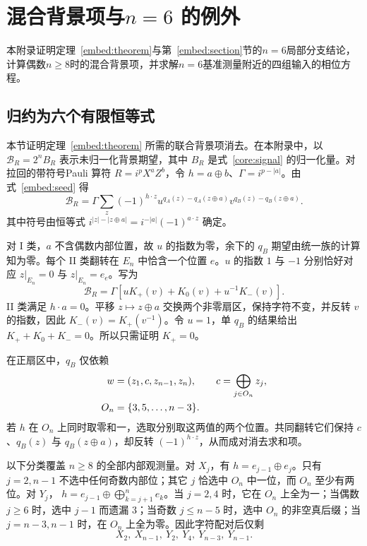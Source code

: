\section{混合背景项与\texorpdfstring{$n=6$}{n=6} 的例外}
\label{embed:appendix}

本附录证明定理~\ref{embed:theorem}与第~\ref{embed:section}节的$n=6$局部分支结论，计算偶数$n\ge8$时的混合背景项，并求解$n=6$基准测量附近的四组输入的相位方程。

\subsection{归约为六个有限恒等式}
\label{embed:app-mixed}

本节证明定理~\ref{embed:theorem} 所需的联合背景项消去。在本附录中，以 $\mathcal B_R=2^n B_R$ 表示未归一化背景期望，其中 $B_R$ 是式~\eqref{core:signal} 的归一化量。对拉回的带符号Pauli 算符 $R=i^pX^aZ^b$，令 $h=a\oplus b$、$\Gamma=i^{p-|a|}$。由式~\eqref{embed:seed} 得
\begin{equation}
 \mathcal B_R=\Gamma\sum_z(-1)^{h\cdot z}
 u^{q_A(z)-q_A(z\oplus a)}
 v^{q_B(z)-q_B(z\oplus a)}.
 \label{embed:background-sum}
\end{equation}
其中符号由恒等式
$i^{|z|-|z\oplus a|}=i^{-|a|}(-1)^{a\cdot z}$ 确定。

对 I 类，$a$ 不含偶数内部位置，故 $u$ 的指数为零，余下的 $q_B$ 期望由统一族的计算知为零。每个 II 类翻转在 $E_n$ 中恰含一个位置 $e$。$u$ 的指数 $1$ 与 $-1$ 分别恰好对应 $z|_{E_n}=0$ 与 $z|_{E_n}=e_e$。写为
\begin{equation}
 \mathcal B_R=\Gamma\left[uK_+(v)+K_0(v)+u^{-1}K_-(v)\right].
 \label{embed:sectors}
\end{equation}
II 类满足 $h\cdot a=0$。平移 $z\mapsto z\oplus a$ 交换两个非零扇区，保持字符不变，并反转 $v$ 的指数，因此
$K_-(v)=K_+(v^{-1})$。令 $u=1$，单 $q_B$ 的结果给出 $K_++K_0+K_-=0$。所以只需证明 $K_+=0$。

在正扇区中，$q_B$ 仅依赖
\begin{align}
 w&=(z_1,c,z_{n-1},z_n),\qquad c=\bigoplus_{j\in O_n}z_j,\notag\\
 O_n&=\{3,5,\ldots,n-3\}.
 \label{embed:four-sector-bits}
\end{align}
若 $h$ 在 $O_n$ 上同时取零和一，选取分别取这两值的两个位置。共同翻转它们保持 $c$、$q_B(z)$ 与 $q_B(z\oplus a)$，却反转 $(-1)^{h\cdot z}$，从而成对消去求和项。

以下分类覆盖 $n\ge8$ 的全部内部观测量。对 $X_j$，有 $h=e_{j-1}\oplus e_j$。只有 $j=2,n-1$ 不选中任何奇数内部位；其它 $j$ 恰选中 $O_n$ 中一位，而 $O_n$ 至少有两位。对 $Y_j$，
$h=e_{j-1}\oplus\bigoplus_{k=j+1}^n e_k$。当 $j=2,4$ 时，它在 $O_n$ 上全为一；当偶数 $j\ge6$ 时，选中 $j-1$ 而遗漏 $3$；当奇数 $j\le n-5$ 时，选中 $O_n$ 的非空真后缀；当 $j=n-3,n-1$ 时，在 $O_n$ 上全为零。因此字符配对后仅剩
\begin{equation}
 X_2,\ X_{n-1},\ Y_2,\ Y_4,\ Y_{n-3},\ Y_{n-1}.
 \label{embed:six-remaining}
\end{equation}

